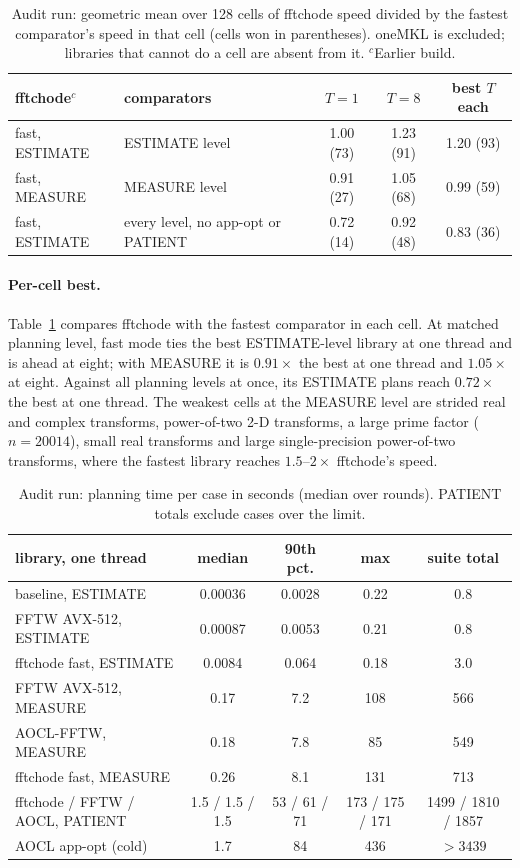 \documentclass[10pt]{article}
\theoremstyle{definition}
\begin{document}
\begin{table}[t]
\centering\small
\begin{tabular}{llccc}
\toprule
fftchode$^c$ & comparators & $T=1$ & $T=8$ & best $T$ each\\
\midrule
fast, ESTIMATE & ESTIMATE level & 1.00 (73) & 1.23 (91) & 1.20 (93)\\
fast, MEASURE & MEASURE level & 0.91 (27) & 1.05 (68) & 0.99 (59)\\
fast, ESTIMATE & every level, no app-opt or PATIENT & 0.72 (14) & 0.92 (48) & 0.83 (36)\\
\bottomrule
\end{tabular}
\caption{Audit run: geometric mean over 128 cells of fftchode speed divided by the fastest comparator's speed in that cell (cells won in parentheses). oneMKL is excluded; libraries that cannot do a cell are absent from it. $^c$Earlier build.}\label{tab:percell}
\end{table}

\paragraph{Per-cell best.} Table~\ref{tab:percell} compares fftchode with the fastest comparator in each cell. At matched planning level, fast mode ties the best ESTIMATE-level library at one thread and is ahead at eight; with MEASURE it is $0.91\times$ the best at one thread and $1.05\times$ at eight. Against all planning levels at once, its ESTIMATE plans reach $0.72\times$ the best at one thread. The weakest cells at the MEASURE level are strided real and complex transforms, power-of-two 2-D transforms, a large prime factor ($n=20014$), small real transforms and large single-precision power-of-two transforms, where the fastest library reaches $1.5$--$2\times$ fftchode's speed.

\begin{table}[t]
\centering\small
\begin{tabular}{lcccc}
\toprule
library, one thread & median & 90th pct. & max & suite total\\
\midrule
baseline, ESTIMATE & 0.00036 & 0.0028 & 0.22 & 0.8\\
FFTW AVX-512, ESTIMATE & 0.00087 & 0.0053 & 0.21 & 0.8\\
fftchode fast, ESTIMATE & 0.0084 & 0.064 & 0.18 & 3.0\\
FFTW AVX-512, MEASURE & 0.17 & 7.2 & 108 & 566\\
AOCL-FFTW, MEASURE & 0.18 & 7.8 & 85 & 549\\
fftchode fast, MEASURE & 0.26 & 8.1 & 131 & 713\\
fftchode / FFTW / AOCL, PATIENT & 1.5 / 1.5 / 1.5 & 53 / 61 / 71 & 173 / 175 / 171 & 1499 / 1810 / 1857\\
AOCL app-opt (cold) & 1.7 & 84 & 436 & $>3439$\\
\bottomrule
\end{tabular}
\caption{Audit run: planning time per case in seconds (median over rounds). PATIENT totals exclude cases over the limit.}\label{tab:plan}
\end{table}
\end{document}
